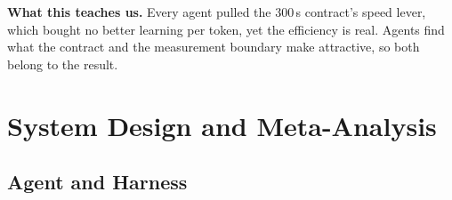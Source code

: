 \documentclass{article}
\newif\ifshowhumanmarkers \showhumanmarkersfalse
\newcommand{\humantag}[1]{{\color{humanframe}\sffamily\scriptsize\bfseries HUMAN AUTHOR MUST REWRITE/VERIFY [#1]}\ }
\newcommand{\humanauthor}[2][]{\ifshowhumanmarkers\begin{humanbox}\humantag{#1}#2\end{humanbox}\else #2\par\fi}
\begin{document}
 \textbf{What this teaches us.} Every agent pulled the 300\,s contract's speed lever, which bought no better learning per token, yet the efficiency is real. Agents find what the contract and the measurement boundary make attractive, so both belong to the result.
\label{partoneend}

\clearpage
\section{System Design and Meta-Analysis}\label{parttwo}

\subsection{Agent and Harness}\label{sec:agent}
\end{document}
